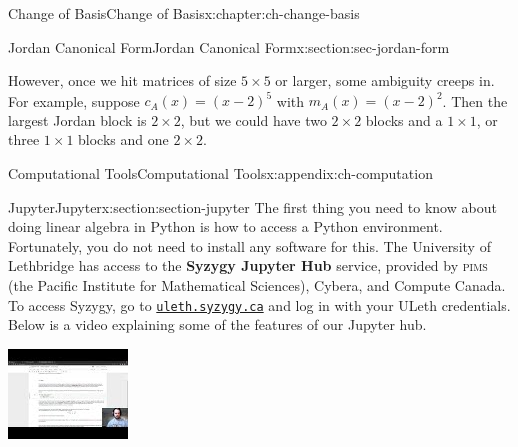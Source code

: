 \documentclass[oneside,10pt,]{book}
\newcommand{\initialism}[1]{\textsc{\MakeLowercase{#1}}}
\newcommand{\terminology}[1]{\textbf{#1}}
\numberwithin{equation}{section}
\newlength{\qrsize}
\newlength{\previewwidth}
\providecommand\phantomsection{}
\begin{document}
\begin{chapterptx}{Change of Basis}{}{Change of Basis}{}{}{x:chapter:ch-change-basis}
\begin{sectionptx}{Jordan Canonical Form}{}{Jordan Canonical Form}{}{}{x:section:sec-jordan-form}
\begin{equation*}
\end{equation*}
%
\par
However, once we hit matrices of size \(5\times 5\) or larger, some ambiguity creeps in. For example, suppose \(c_A(x) = (x-2)^5\) with \(m_A(x)=(x-2)^2\). Then the largest Jordan block is \(2\times 2\), but we could have two \(2\times 2\) blocks and a \(1\times 1\), or three \(1\times 1\) blocks and one \(2\times 2\).%
\end{sectionptx}
\end{chapterptx}
%
\appendix%
%
\clearpage\phantomsection%
%
%
%
\typeout{************************************************}
\typeout{************************************************}
%
\begin{appendixptx}{Computational Tools}{}{Computational Tools}{}{}{x:appendix:ch-computation}
%
%
\typeout{************************************************}
\typeout{************************************************}
%
\begin{sectionptx}{Jupyter}{}{Jupyter}{}{}{x:section:section-jupyter}
The first thing you need to know about doing linear algebra in Python is how to access a Python environment. Fortunately, you do not need to install any software for this. The University of Lethbridge has access to the \terminology{Syzygy Jupyter Hub} service, provided by \initialism{PIMS} (the Pacific Institute for Mathematical Sciences), Cybera, and Compute Canada. To access Syzygy, go to \href{https://uleth.syzygy.ca}{\nolinkurl{uleth.syzygy.ca}} and log in with your ULeth credentials. Below is a video explaining some of the features of our Jupyter hub.%
\setlength{\qrsize}{9em}
\setlength{\previewwidth}{\linewidth}
\addtolength{\previewwidth}{-\qrsize}
\begin{tcbraster}[raster columns=2, raster column skip=1pt, raster halign=center, raster force size=false, raster left skip=0pt, raster right skip=0pt]%
\begin{tcolorbox}[previewstyle, width=\previewwidth]%
\includegraphics[width=0.80\linewidth,height=\qrsize,keepaspectratio]{generated/youtube/video-1.jpg}%

\end{tcolorbox}
\end{tcbraster}
\end{sectionptx}
\end{appendixptx}
\end{document}
